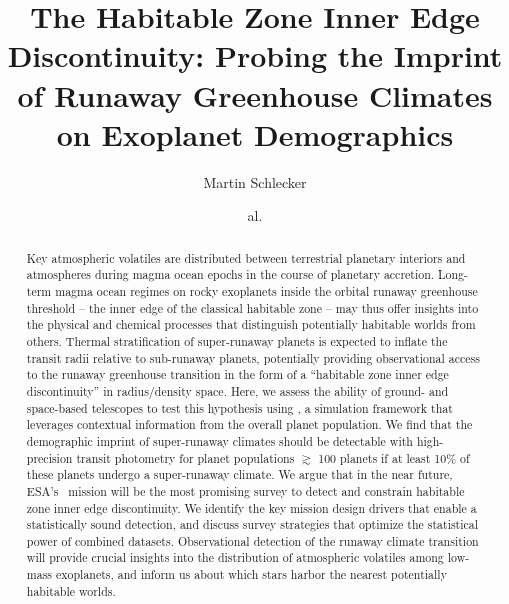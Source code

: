 \documentclass[twocolumn,twocolappendix]{aastex631}
\begin{document}
\title{The Habitable Zone Inner Edge Discontinuity: Probing the Imprint of Runaway Greenhouse Climates on Exoplanet Demographics}

\author[0000-0001-8355-2107]{Martin Schlecker}
\author{al.}

\begin{abstract}
Key atmospheric volatiles are distributed between terrestrial planetary interiors and atmospheres during magma ocean epochs in the course of planetary accretion.
Long-term magma ocean regimes on rocky exoplanets inside the orbital runaway greenhouse threshold -- the inner edge of the classical habitable zone -- may thus offer insights into the physical and chemical processes that distinguish potentially habitable worlds from others.
Thermal stratification of super-runaway planets is expected to inflate the transit radii relative to sub-runaway planets, potentially providing observational access to the runaway greenhouse transition in the form of a ``habitable zone inner edge discontinuity'' in radius/density space.
Here, we assess the ability of ground- and space-based telescopes to test this hypothesis using \bioverse, a simulation framework that leverages contextual information from the overall planet population.
We find that the demographic imprint of super-runaway climates should be detectable with high-precision transit photometry for planet populations $\gtrsim$ 100 planets if at least 10\% of these planets undergo a super-runaway climate.
We argue that in the near future, ESA's \plato\ mission will be the most promising survey to detect and constrain habitable zone inner edge discontinuity.
We identify the key mission design drivers that enable a statistically sound detection, and discuss survey strategies that optimize the statistical power of combined datasets.
Observational detection of the runaway climate transition will provide crucial insights into the distribution of atmospheric volatiles among low-mass exoplanets, and inform us about which stars harbor the nearest potentially habitable worlds.
\end{abstract}

\end{document}
